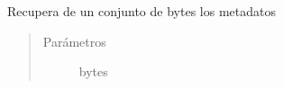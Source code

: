 \documentclass[a4paper,12pt,spanish]{sphinxmanual}
\begin{document}
\begin{fulllineitems}
\begin{fulllineitems}
\end{fulllineitems}


\begin{fulllineitems}
\label{\detokenize{openerm.MetadataContainer:openerm.MetadataContainer.MetadataContainer.load}}
Recupera de un conjunto de bytes los metadatos
\begin{quote}\begin{description}
\item[{Parámetros}] \leavevmode
{} \textendash{} bytes


\end{description}
\end{quote}
\end{fulllineitems}
\end{fulllineitems}
\end{document}
